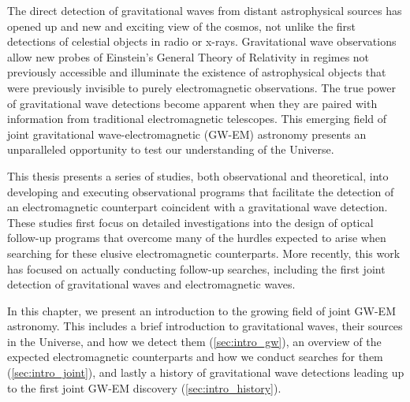 The direct detection of gravitational waves from distant astrophysical sources has opened up and new and exciting view of the cosmos, not unlike the first detections of celestial objects in radio or x-rays. Gravitational wave observations allow new probes of Einstein's General Theory of Relativity in regimes not previously accessible and illuminate the existence of astrophysical objects that were previously invisible to purely electromagnetic observations. The true power of gravitational wave detections become apparent when they are paired with information from traditional electromagnetic telescopes. This emerging field of joint gravitational wave-electromagnetic (GW-EM) astronomy presents an unparalleled opportunity to test our understanding of the Universe.

This thesis presents a series of studies, both observational and theoretical, into developing and executing observational programs that facilitate the detection of an electromagnetic counterpart coincident with a gravitational wave detection. These studies first focus on detailed investigations into the design of optical follow-up programs that overcome many of the hurdles expected to arise when searching for these elusive electromagnetic counterparts. More recently, this work has focused on actually conducting follow-up searches, including the first joint detection of gravitational waves and electromagnetic waves.

In this chapter, we present an introduction to the growing field of joint GW-EM astronomy. This includes a brief introduction to gravitational waves, their sources in the Universe, and how we detect them (\cref{sec:intro_gw}), an overview of the expected electromagnetic counterparts and how we conduct searches for them (\cref{sec:intro_joint}), and lastly a history of gravitational wave detections leading up to the first joint GW-EM discovery (\cref{sec:intro_history}).

